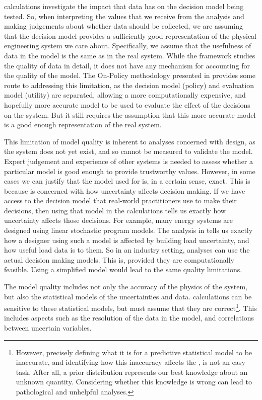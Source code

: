  calculations investigate the impact that data has on the decision model being tested. So, when interpreting the  values that we receive from the analysis and making judgements about whether data should be collected, we are assuming that the decision model provides a sufficiently good representation of the physical engineering system we care about. Specifically, we assume that the usefulness of data in the model is the same as in the real system. While the  framework studies the quality of data in detail, it does not have any mechanism for accounting for the quality of the model. The On-Policy  methodology presented in  provides some route to addressing this limitation, as the decision model (policy) and evaluation model (utility) are separated, allowing a more computationally expensive, and hopefully more accurate model to be used to evaluate the effect of the decisions on the system. But it still requires the assumption that this more accurate model is a good enough representation of the real system.

This limitation of model quality is inherent to analyses concerned with design, as the system does not yet exist, and so cannot be measured to validate the model. Expert judgement and experience of other systems is needed to assess whether a particular model is good enough to provide trustworthy  values. However, in some cases we can justify that the model used for  is, in a certain sense, exact. This is because  is concerned with how uncertainty affects decision making. If we have access to the decision model that real-world practitioners use to make their decisions, then using that model in the calculations tells us exactly how uncertainty affects those decisions. For example, many energy systems are designed using linear stochastic program models. The analysis in  tells us exactly how a designer using such a model is affected by building load uncertainty, and how useful load data is to them. So in an industry setting,  analyses can use the actual decision making models. This is, provided they are computationally feasible. Using a simplified model would lead to the same quality limitations.

The model quality includes not only the accuracy of the physics of the system, but also the statistical models of the uncertainties and data.  calculations can be sensitive to these statistical models, but must assume that they are correct\footnote{However, precisely defining what it is for a predictive statistical model to be inaccurate, and identifying how this inaccuracy affects the , is not an easy task. After all, a prior distribution represents our best knowledge about an unknown quantity. Considering whether this knowledge is wrong can lead to pathological and unhelpful analyses.}. This includes aspects such as the resolution of the data in the model, and correlations between uncertain variables.\\

